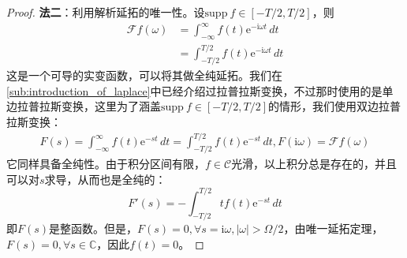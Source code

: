 \documentclass{ctexbook}
\begin{document}
\begin{proof}
\textbf{法二}：利用解析延拓的唯一性。设$\text{supp}\ f\in[-T/2,T/2]$，则\begin{align*}
    \mathcal{F} f(\omega)&=\int_{-\infty}^{\infty}f(t)\mathrm{e}^{-\mathrm{i}\omega t}\,dt\\
    &=\int_{-T/2}^{T/2}f(t)\mathrm{e}^{-\mathrm{i}\omega t}\,dt
\end{align*}
这是一个可导的实变函数，可以将其做全纯延拓。我们在\ref{sub:introduction_of_laplace}中已经介绍过拉普拉斯变换，不过那时使用的是单边拉普拉斯变换，这里为了涵盖$\text{supp}\ f\in[-T/2,T/2]$的情形，我们使用双边拉普拉斯变换：
\begin{align*}
    F(s)=\int_{-\infty}^{\infty}f(t)\mathrm{e}^{-st}\,dt=\int_{-T/2}^{T/2}f(t)\mathrm{e}^{-st}\,dt,F(\mathrm{i}\omega)=\mathcal{F} f(\omega)
\end{align*}
它同样具备全纯性。由于积分区间有限，$f\in\mathcal{C} $光滑，以上积分总是存在的，并且可以对$s$求导，从而也是全纯的：\[F'(s)=-\int_{-T/2}^{T/2}tf(t)\mathrm{e}^{-st}\,dt\]
即$F(s)$是整函数。但是，$F(s)=0,\forall s=\mathrm{i}\omega,|\omega|> \Omega/2$，由唯一延拓定理，$F(s)=0,\forall s\in\mathbb{C}$，因此$f(t)=0$。
\end{proof}
\end{document}
